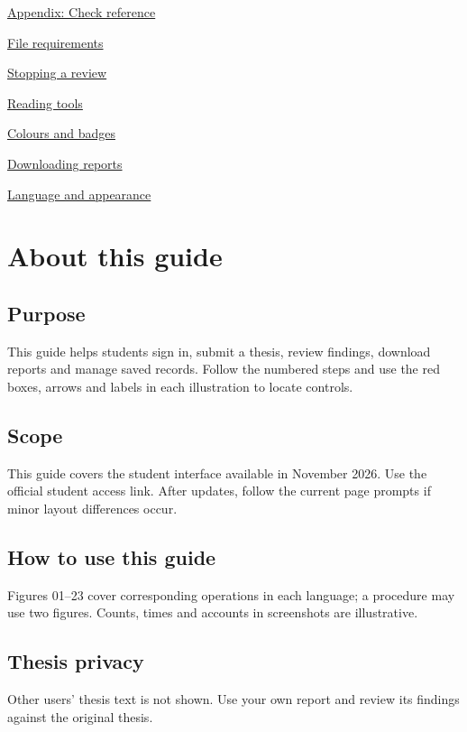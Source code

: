 \documentclass[12pt,a4paper]{article}
\begin{document}
\noindent\hyperref[en:rules]{Appendix: Check reference}\dotfill\pageref{en:rules}\par\vspace{5mm}
\par
\hyperref[en:upload]{File requirements}\dotfill\pageref{en:upload}\par
\hyperref[en:progress]{Stopping a review}\dotfill\pageref{en:progress}\par
\hyperref[en:reading]{Reading tools}\dotfill\pageref{en:reading}\par
\hyperref[en:badges]{Colours and badges}\dotfill\pageref{en:badges}\par
\hyperref[en:export]{Downloading reports}\dotfill\pageref{en:export}\par
\hyperref[en:settings]{Language and appearance}\dotfill\pageref{en:settings}\par
\clearpage\setcounter{section}{0}\section{About this guide}\label{en:intro}
\subsection*{Purpose}This guide helps students sign in, submit a thesis, review findings, download reports and manage saved records. Follow the numbered steps and use the red boxes, arrows and labels in each illustration to locate controls.\par
\subsection*{Scope}This guide covers the student interface available in November 2026. Use the official student access link. After updates, follow the current page prompts if minor layout differences occur.\par
\subsection*{How to use this guide}Figures 01–23 cover corresponding operations in each language; a procedure may use two figures. Counts, times and accounts in screenshots are illustrative.\par
\subsection*{Thesis privacy}Other users’ thesis text is not shown. Use your own report and review its findings against the original thesis.\par
\end{document}
